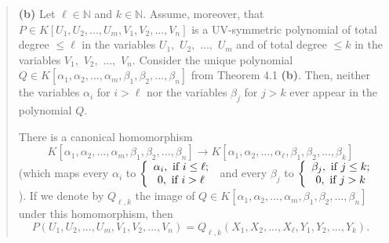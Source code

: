 \documentclass[numbers=enddot,12pt,final,onecolumn,notitlepage]{scrartcl}%
\begin{document}
\begin{quote}
\textbf{(b)} Let $\ell\in\mathbb{N}$ and $k\in\mathbb{N}$. Assume, moreover,
that $P\in K\left[  U_{1},U_{2},...,U_{m},V_{1},V_{2},...,V_{n}\right]  $ is a
UV-symmetric polynomial of total degree $\leq\ell$ in the variables $U_{1},$
$U_{2},$ $...,$ $U_{m}$ and of total degree $\leq k$ in the variables $V_{1},$
$V_{2},$ $...,$ $V_{n}.$ Consider the unique polynomial $Q\in K\left[
\alpha_{1},\alpha_{2},...,\alpha_{m},\beta_{1},\beta_{2},...,\beta_{n}\right]
$ from Theorem 4.1 \textbf{(b)}. Then, neither the variables $\alpha_{i}$ for
$i>\ell$ nor the variables $\beta_{j}$ for $j>k$ ever appear in the polynomial
$Q$.

There is a canonical homomorphism%
\[
K\left[  \alpha_{1},\alpha_{2},...,\alpha_{m},\beta_{1},\beta_{2}%
,...,\beta_{n}\right]  \rightarrow K\left[  \alpha_{1},\alpha_{2}%
,...,\alpha_{\ell},\beta_{1},\beta_{2},...,\beta_{k}\right]
\]
(which maps every $\alpha_{i}$ to $\left\{
\begin{array}
[c]{c}%
\alpha_{i},\text{ if }i\leq\ell;\\
0,\text{ if }i>\ell
\end{array}
\right.  $ and every $\beta_{j}$ to $\left\{
\begin{array}
[c]{c}%
\beta_{j},\text{ if }j\leq k;\\
0,\text{ if }j>k
\end{array}
\right.  $). If we denote by $Q_{\ell,k}$ the image of $Q\in K\left[
\alpha_{1},\alpha_{2},...,\alpha_{m},\beta_{1},\beta_{2},...,\beta_{n}\right]
$ under this homomorphism, then%
\[
P\left(  U_{1},U_{2},...,U_{m},V_{1},V_{2},...,V_{n}\right)  =Q_{\ell
,k}\left(  X_{1},X_{2},...,X_{\ell},Y_{1},Y_{2},...,Y_{k}\right)  .
\]



\end{quote}
\end{document}
